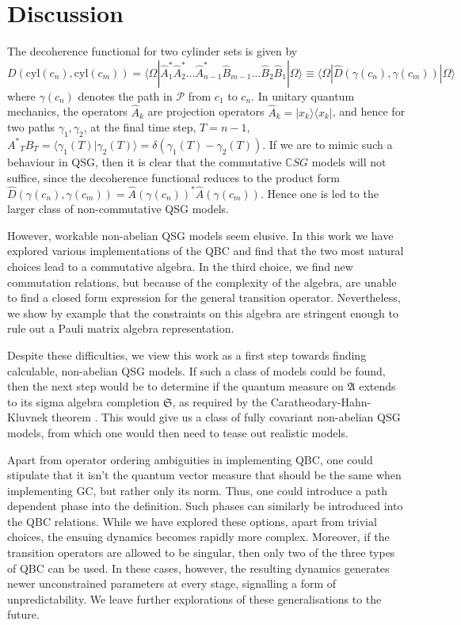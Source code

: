\documentclass[11pt]{article}
\newcommand{\bC}{\mathbb C}
\newcommand{\hA}{\hat { A}}
\newcommand{\ket}[1]{| #1 \rangle}
\newcommand{\bra}[1]{\langle #1|}
\newcommand{\braket}[2]{\langle #1| #2\rangle}
\newcommand{\cyl}[1]{{\mathrm{cyl}({#1})}}
\newcommand{\cP}{\mathcal P}
\newcommand{\fA}{\mathfrak A}
\newcommand{\fS}{\mathfrak S}
\newcommand{\CSG}{\bC S G}
\newcommand{\h}{\hat}
\begin{document}
\section{Discussion}
\label{discussion.sec}

The decoherence functional for two cylinder sets is given by 
\begin{equation} 
  D(\cyl{c_n},\cyl{c_m})=\bra{\Omega}\h A_1^\ast \h A_2^\ast \ldots \h
  A^\ast_{n-1} \h B_{m-1} \ldots \h B_2 \h B_1
  \ket{\Omega} \equiv \bra{\Omega} \h D(\gamma(c_n),\gamma(c_m))\ket{\Omega}
\end{equation}
where $\gamma(c_n)$ denotes the path in $\cP$ from $c_1$ to $c_n$. In unitary quantum mechanics, the operators $\h A_k$ are 
projection operators $\hA_k=\ket{x_k}\bra{x_k}$, and hence for two
paths $\gamma_1, \gamma_2$,  at the final time step, $T=n-1$,
${A^\ast}_{T}B_{T}= \braket{\gamma_1(T)}{\gamma_2(T)} =\delta(\gamma_1(T)-\gamma_2(T))$. If we are
to mimic such a behaviour in QSG, then it is clear that the commutative $\CSG$ models
will not suffice, since the decoherence functional reduces to the
product form  $\h D(\gamma(c_n),\gamma(c_m)) = \h
A(\gamma(c_n))^\ast \h A(\gamma(c_m))$. Hence one is led to the
larger class of  non-commutative QSG models. 

However, workable non-abelian QSG models seem elusive. 
In this work we have explored various implementations of the QBC and
find that the two most natural choices lead to a commutative
algebra. In the third choice, we find new commutation
relations, but because of the complexity of the algebra, are unable to
find a closed form expression for the general transition
operator. Nevertheless, we show by example 
that the constraints on this algebra are stringent enough to rule out
a Pauli matrix algebra representation. 

Despite these difficulties, we view this work as a first step towards
finding calculable,
non-abelian QSG
models. If such a class of models could be found, then  the next
step would be  to determine if the quantum measure on $\fA$ extends to
its sigma
algebra completion $\fS$, as  required by the
Caratheodary-Hahn-Kluvnek theorem \cite{diestel,sz}. This would give
us a class of fully covariant non-abelian QSG models, from which one
would then need to tease out realistic models.


Apart from operator ordering ambiguities in implementing QBC, one could stipulate that it
isn't the quantum vector measure that should be the same when
implementing GC, but rather only its norm. Thus, one could introduce a
path dependent phase into the definition. Such phases can similarly be
introduced into the QBC relations.  While we have explored these
options, apart from trivial choices, the ensuing dynamics becomes
rapidly more complex. Moreover, if the transition operators are allowed to be singular, then only two
of the three types  of QBC  can be used. In these cases, however, the  resulting dynamics
generates newer unconstrained  parameters at every stage, signalling a
form of unpredictability. We leave further explorations of these
generalisations to the future.
\end{document}
